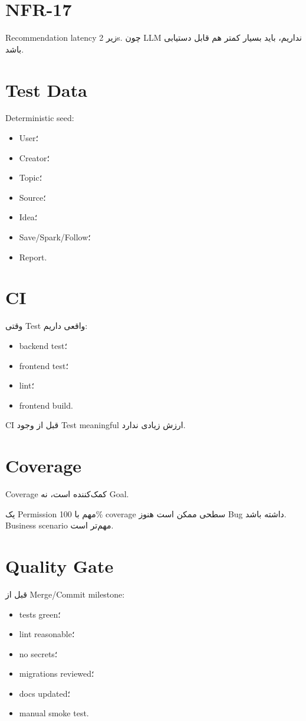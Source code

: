 \section{NFR-17}

Recommendation latency زیر 2s. چون LLM نداریم، باید بسیار کمتر هم قابل دستیابی باشد.

\section{Test Data}

Deterministic seed:
\begin{itemize}
  \item User؛
  \item Creator؛
  \item Topic؛
  \item Source؛
  \item Idea؛
  \item Save/Spark/Follow؛
  \item Report.
\end{itemize}

\section{CI}

وقتی Test واقعی داریم:
\begin{itemize}
  \item backend test؛
  \item frontend test؛
  \item lint؛
  \item frontend build.
\end{itemize}

CI قبل از وجود Test meaningful ارزش زیادی ندارد.

\section{Coverage}

Coverage کمک‌کننده است، نه Goal.

یک Permission مهم با 100\% coverage سطحی ممکن است هنوز Bug داشته باشد. Business scenario مهم‌تر است.

\section{Quality Gate}

قبل از Merge/Commit milestone:
\begin{itemize}
  \item tests green؛
  \item lint reasonable؛
  \item no secrets؛
  \item migrations reviewed؛
  \item docs updated؛
  \item manual smoke test.
\end{itemize}
